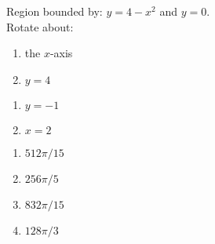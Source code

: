 {Region bounded by: $y=4-x^2$ and $y=0$.\\
Rotate about:\\
\begin{minipage}[t]{.5\linewidth}
\begin{enumerate}
\item		the $x$-axis
\item		$y=4$
\end{enumerate}
\end{minipage}%
\begin{minipage}[t]{.5\linewidth}
\begin{enumerate}\addtocounter{enumii}{2}
\item		$y=-1$
\item		$x=2$
\end{enumerate}
\end{minipage}
}
{\begin{enumerate}
\item $512\pi/15$
\item $256\pi/5$
\item $832\pi/15$
\item $128\pi/3$
\end{enumerate}
}
